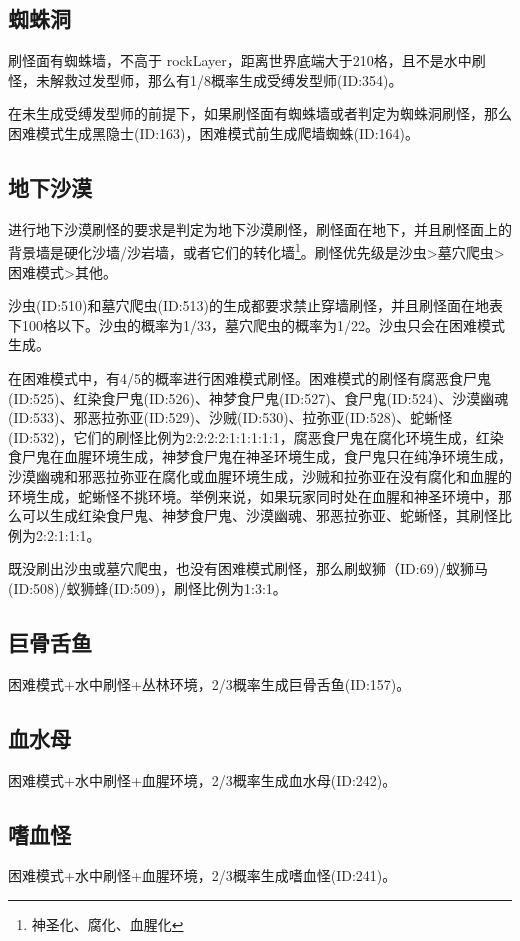 \subsection{蜘蛛洞}
刷怪面有蜘蛛墙，不高于 rockLayer，距离世界底端大于210格，且不是水中刷怪，未解救过发型师，那么有1/8概率生成受缚发型师(ID:354)。

在未生成受缚发型师的前提下，如果刷怪面有蜘蛛墙或者判定为蜘蛛洞刷怪，那么困难模式生成黑隐士(ID:163)，困难模式前生成爬墙蜘蛛(ID:164)。

\subsection{地下沙漠}
进行地下沙漠刷怪的要求是判定为地下沙漠刷怪，刷怪面在地下，并且刷怪面上的背景墙是硬化沙墙/沙岩墙，或者它们的转化墙\footnote{神圣化、腐化、血腥化}。刷怪优先级是沙虫>墓穴爬虫>困难模式>其他。

沙虫(ID:510)和墓穴爬虫(ID:513)的生成都要求禁止穿墙刷怪，并且刷怪面在地表下100格以下。沙虫的概率为1/33，墓穴爬虫的概率为1/22。沙虫只会在困难模式生成。

在困难模式中，有4/5的概率进行困难模式刷怪。困难模式的刷怪有腐恶食尸鬼(ID:525)、红染食尸鬼(ID:526)、神梦食尸鬼(ID:527)、食尸鬼(ID:524)、沙漠幽魂(ID:533)、邪恶拉弥亚(ID:529)、沙贼(ID:530)、拉弥亚(ID:528)、蛇蜥怪(ID:532)，它们的刷怪比例为2:2:2:2:1:1:1:1:1，腐恶食尸鬼在腐化环境生成，红染食尸鬼在血腥环境生成，神梦食尸鬼在神圣环境生成，食尸鬼只在纯净环境生成，沙漠幽魂和邪恶拉弥亚在腐化或血腥环境生成，沙贼和拉弥亚在没有腐化和血腥的环境生成，蛇蜥怪不挑环境。举例来说，如果玩家同时处在血腥和神圣环境中，那么可以生成红染食尸鬼、神梦食尸鬼、沙漠幽魂、邪恶拉弥亚、蛇蜥怪，其刷怪比例为2:2:1:1:1。

既没刷出沙虫或墓穴爬虫，也没有困难模式刷怪，那么刷蚁狮（ID:69)/蚁狮马(ID:508)/蚁狮蜂(ID:509)，刷怪比例为1:3:1。

\subsection{巨骨舌鱼}
困难模式+水中刷怪+丛林环境，2/3概率生成巨骨舌鱼(ID:157)。

\subsection{血水母}
困难模式+水中刷怪+血腥环境，2/3概率生成血水母(ID:242)。

\subsection{嗜血怪}
困难模式+水中刷怪+血腥环境，2/3概率生成嗜血怪(ID:241)。

